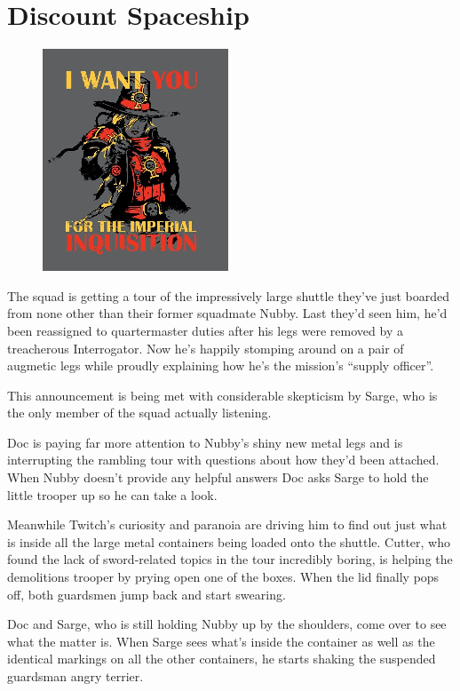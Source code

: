 \chapter{Discount Spaceship}

\begin{figure}
	\begin{center}
		\includegraphics[width=\figwidth]{pics/7/1.png}
	\end{center}
\end{figure}
The squad is getting a tour of the impressively large shuttle they’ve just boarded from none other than their former squadmate Nubby. 
Last they’d seen him, he’d been reassigned to quartermaster duties after his legs were removed by a treacherous Interrogator. 
Now he’s happily stomping around on a pair of augmetic legs while proudly explaining how he’s the mission’s “supply officer”. 

This announcement is being met with considerable skepticism by Sarge, who is the only member of the squad actually listening.

Doc is paying far more attention to Nubby’s shiny new metal legs and is interrupting the rambling tour with questions about how they’d been attached. 
When Nubby doesn’t provide any helpful answers Doc asks Sarge to hold the little trooper up so he can take a look.

Meanwhile Twitch’s curiosity and paranoia are driving him to find out just what is inside all the large metal containers being loaded onto the shuttle. 
Cutter, who found the lack of sword-related topics in the tour incredibly boring, is helping the demolitions trooper by prying open one of the boxes. 
When the lid finally pops off, both guardsmen jump back and start swearing.

Doc and Sarge, who is still holding Nubby up by the shoulders, come over to see what the matter is. 
When Sarge sees what’s inside the container as well as the identical markings on all the other containers, he starts shaking the suspended guardsman angry terrier.

